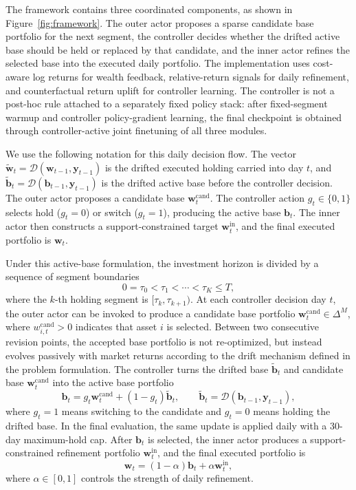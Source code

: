 \documentclass[letterpaper]{article} %
\begin{document}
The framework contains three coordinated components, as shown in Figure~\ref{fig:framework}. The outer actor proposes a sparse candidate base portfolio for the next segment, the controller decides whether the drifted active base should be held or replaced by that candidate, and the inner actor refines the selected base into the executed daily portfolio. The implementation uses cost-aware log returns for wealth feedback, relative-return signals for daily refinement, and counterfactual return uplift for controller learning. The controller is not a post-hoc rule attached to a separately fixed policy stack: after fixed-segment warmup and controller policy-gradient learning, the final checkpoint is obtained through controller-active joint finetuning of all three modules.

We use the following notation for this daily decision flow. The vector \(\tilde{\mathbf{w}}_t=\mathcal{D}(\mathbf{w}_{t-1},\mathbf{y}_{t-1})\) is the drifted executed holding carried into day \(t\), and \(\tilde{\mathbf{b}}_t=\mathcal{D}(\mathbf{b}_{t-1},\mathbf{y}_{t-1})\) is the drifted active base before the controller decision. The outer actor proposes a candidate base \(\mathbf{w}_t^{\mathrm{cand}}\). The controller action \(g_t\in\{0,1\}\) selects hold (\(g_t=0\)) or switch (\(g_t=1\)), producing the active base \(\mathbf{b}_t\). The inner actor then constructs a support-constrained target \(\mathbf{w}_t^{\mathrm{in}}\), and the final executed portfolio is \(\mathbf{w}_t\).

Under this active-base formulation, the investment horizon is divided by a sequence of segment boundaries
\[
0=\tau_0<\tau_1<\cdots<\tau_K\le T,
\]
where the \(k\)-th holding segment is \([\tau_k,\tau_{k+1})\). At each controller decision day \(t\), the outer actor can be invoked to produce a candidate base portfolio \(\mathbf{w}_{t}^{\mathrm{cand}}\in\Delta^M\), where \(w_{i,t}^{\mathrm{cand}}>0\) indicates that asset \(i\) is selected. Between two consecutive revision points, the accepted base portfolio is not re-optimized, but instead evolves passively with market returns according to the drift mechanism defined in the problem formulation. The controller turns the drifted base \(\tilde{\mathbf{b}}_t\) and candidate base \(\mathbf{w}_t^{\mathrm{cand}}\) into the active base portfolio
\[
\mathbf{b}_t
=
g_t\mathbf{w}_t^{\mathrm{cand}}+(1-g_t)\tilde{\mathbf{b}}_t,
\qquad
\tilde{\mathbf{b}}_t=\mathcal{D}(\mathbf{b}_{t-1},\mathbf{y}_{t-1}),
\]
where \(g_t=1\) means switching to the candidate and \(g_t=0\) means holding the drifted base. In the final evaluation, the same update is applied daily with a 30-day maximum-hold cap. After \(\mathbf{b}_t\) is selected, the inner actor produces a support-constrained refinement portfolio \(\mathbf{w}_t^{\mathrm{in}}\), and the final executed portfolio is
\[
\mathbf{w}_t=(1-\alpha)\mathbf{b}_t+\alpha\mathbf{w}_t^{\mathrm{in}},
\]
where \(\alpha\in[0,1]\) controls the strength of daily refinement.
\end{document}
